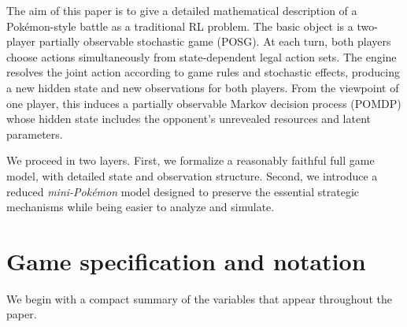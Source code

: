 \documentclass[aps,pre,twocolumn,superscriptaddress,nofootinbib]{revtex4-2}
\theoremstyle{definition}
\theoremstyle{plain}
\begin{document}
The aim of this paper is to give a detailed mathematical description of a Pok\'emon-style battle as a traditional RL problem. The basic object is a two-player partially observable stochastic game (POSG). At each turn, both players choose actions simultaneously from state-dependent legal action sets. The engine resolves the joint action according to game rules and stochastic effects, producing a new hidden state and new observations for both players. From the viewpoint of one player, this induces a partially observable Markov decision process (POMDP) whose hidden state includes the opponent's unrevealed resources and latent parameters.

We proceed in two layers. First, we formalize a reasonably faithful full game model, with detailed state and observation structure. Second, we introduce a reduced \emph{mini-Pok\'emon} model designed to preserve the essential strategic mechanisms while being easier to analyze and simulate.

\section{Game specification and notation}
\label{sec:notation}

We begin with a compact summary of the variables that appear throughout the paper.
\end{document}
